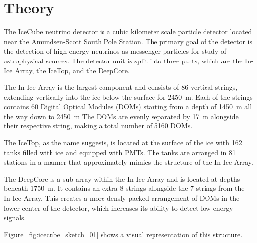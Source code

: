 \chapter{Theory}


The IceCube neutrino detector is a cubic kilometer scale particle detector located near the Amundsen-Scott South Pole Station. The primary goal of 
the detector is the detection of high energy neutrinos as messenger particles for study of astrophysical sources. The detector unit is split into three 
parts, which are the In-Ice Array, the IceTop, and the DeepCore. 

The In-Ice Array is the largest component and consists of 86 vertical strings, extending vertically into the ice below the surface for \SI{2450}{\metre}. 
Each of the strings contains 60 Digital Optical Modules (DOMs) starting from a depth of \SI{1450}{\metre} all the way down to \SI{2450}{\metre}
The DOMs are evenly separated by \SI{17}{\metre} alongside their respective string, making a total number of \num{5160} DOMs. 

The IceTop, as the name suggests, is located at the surface of the ice with \num{162} tanks filled with ice and equipped with PMTs. 
The tanks are arranged in 81 stations in a manner that approximately mimics the structure of the In-Ice Array. 

The DeepCore is a sub-array within the In-Ice Array and is located at depths beneath \SI{1750}{\metre}. It contains an extra \num{8} strings alongside the 
\num{7} strings from the In-Ice Array. This creates a more densly packed arrangement of DOMs in the lower center of the detector, which increases its 
ability to detect low-energy signals.

Figure~\ref{fig:icecube_sketch_01} shows a visual representation of this structure.

